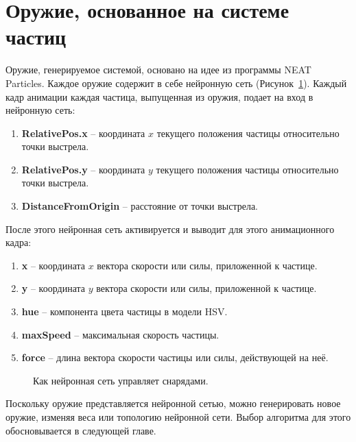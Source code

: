 ﻿%
\section{Оружие, основанное на системе частиц}\label{sec:WeaponIdea}

Оружие, генерируемое системой, основано на идее из программы NEAT Particles\cite{s2,s3, s12}. Каждое оружие содержит в себе нейронную сеть (Рисунок~\ref{Weapon}). Каждый кадр анимации каждая частица, выпущенная из оружия, подает на вход в нейронную сеть:

\begin{enumerate}
    \item {\small \textbf{RelativePos.x}} -- координата $x$ текущего положения частицы относительно точки выстрела.
    \item {\small \textbf{RelativePos.y}} -- координата $y$ текущего положения частицы относительно точки выстрела.
    \item {\small \textbf{DistanceFromOrigin}} -- расстояние от точки выстрела.
\end{enumerate}

После этого нейронная сеть активируется и выводит для этого анимационного кадра:

\begin{enumerate}
    \item {\small \textbf{x}} -- координата $x$ вектора скорости или силы, приложенной к частице.
    \item {\small \textbf{y}} -- координата $y$ вектора скорости или силы, приложенной к частице.
    \item {\small \textbf{hue}} -- компонента цвета частицы в модели HSV\@.
    \item {\small \textbf{maxSpeed}} -- максимальная скорость частицы.
    \item {\small \textbf{force}} -- длина вектора скорости частицы или силы, действующей на неё.
\end{enumerate}


\begin{figure}[ht]
    \begin{center}

        \caption{
            \label{Weapon}
            Как нейронная сеть управляет снарядами.}
    \end {center}
\end {figure}


Поскольку оружие представляется нейронной сетью, можно генерировать новое оружие, изменяя веса или топологию нейронной сети. Выбор алгоритма для этого обосновывается в следующей главе.
